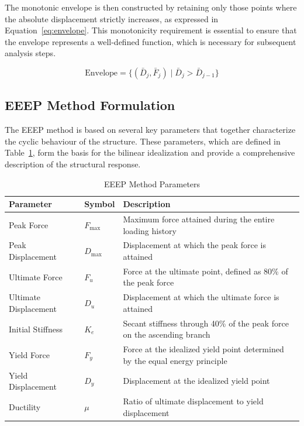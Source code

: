 \documentclass[11pt,a4paper]{article}
\begin{document}
The monotonic envelope is then constructed by retaining only those points where the absolute displacement strictly increases, as expressed in Equation~\ref{eq:envelope}. This monotonicity requirement is essential to ensure that the envelope represents a well-defined function, which is necessary for subsequent analysis steps.

\begin{equation}
\text{Envelope} = \{ (\bar{D}_j, \bar{F}_j) \mid \bar{D}_j > \bar{D}_{j-1} \}
\label{eq:envelope}
\end{equation}

\subsection{EEEP Method Formulation}

The EEEP method is based on several key parameters that together characterize the cyclic behaviour of the structure. These parameters, which are defined in Table~\ref{tab:eeep_params}, form the basis for the bilinear idealization and provide a comprehensive description of the structural response.

\begin{table}[h]
\centering
\caption{EEEP Method Parameters}\label{tab:eeep_params}
\begin{tabular}{p{3cm}p{3cm}p{8cm}}
\toprule
\textbf{Parameter} & \textbf{Symbol} & \textbf{Description} \\
\midrule
Peak Force & \(F_{\max}\) & Maximum force attained during the entire loading history \\
Peak Displacement & \(D_{\max}\) & Displacement at which the peak force is attained \\
Ultimate Force & \(F_u\) & Force at the ultimate point, defined as 80\% of the peak force \\
Ultimate Displacement & \(D_u\) & Displacement at which the ultimate force is attained \\
Initial Stiffness & \(K_e\) & Secant stiffness through 40\% of the peak force on the ascending branch \\
Yield Force & \(F_y\) & Force at the idealized yield point determined by the equal energy principle \\
Yield Displacement & \(D_y\) & Displacement at the idealized yield point \\
Ductility & \(\mu\) & Ratio of ultimate displacement to yield displacement \\
\bottomrule
\end{tabular}
\end{table}
\end{document}
